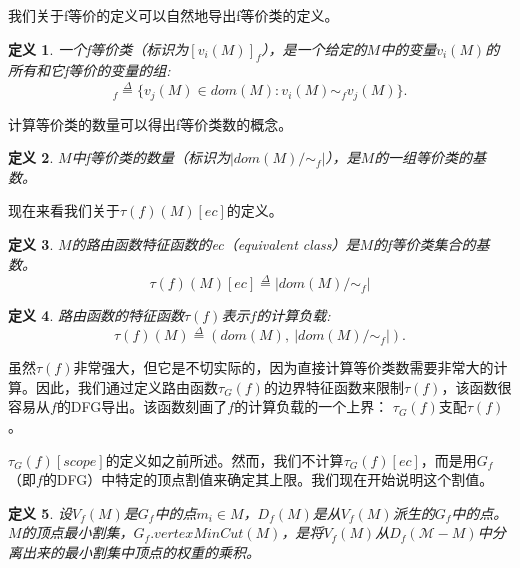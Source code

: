 \documentclass{ctexart}
\newtheorem{definition}{定义}
\begin{document}
我们关于f等价的定义可以自然地导出f等价类的定义。 
\begin{definition} 一个f等价类（标识为$[v_i(M)]_f$），是一个给定的$M$中的变量$v_i(M)$的所有和它f等价的变量的组:
\begin{equation*}
[v_i(M)]_f \overset{\Delta}{=} \{v_j(M) \in dom(M) : v_i(M) \sim_f v_j(M)\}.
\end{equation*}
\end{definition}

计算等价类的数量可以得出f等价类数的概念。
 
\begin{definition}
$M$中f等价类的数量（标识为$|dom(M)/\sim_f|$），是$M$的一组等价类的基数。
\end{definition}

现在来看我们关于$\tau(f)(M)[ec]$的定义。

\begin{definition}  $M$的路由函数特征函数的ec（equivalent class）是$M$的f等价类集合的基数。 
\begin{equation*}
\tau(f)(M)[ec] \overset{\Delta}{=} |dom(M)/\sim_f|
\end{equation*}
\end{definition}


\begin{definition} 路由函数的特征函数$\tau(f)$表示$f$的计算负载:
\begin{equation*}
\tau(f)(M) \overset{\Delta}{=} (dom(M),\ |dom(M)/\sim_f|).
\end{equation*}
\end{definition}




虽然$\tau(f)$非常强大，但它是不切实际的，因为直接计算等价类数需要非常大的计算。因此，我们通过定义路由函数$\tau_G(f)$的边界特征函数来限制$\tau(f)$，该函数很容易从$f$的DFG导出。该函数刻画了$f$的计算负载的一个上界： $\tau_G(f)$支配$\tau(f)$。

$\tau_G(f)[scope]$的定义如之前所述。然而，我们不计算$\tau_G(f)[ec]$，而是用$G_f$（即$f$的DFG）中特定的顶点割值来确定其上限。我们现在开始说明这个割值。


\begin{definition} 设$V_f(M)$是$G_f$中的点$m_i \in M$，$D_f(M)$是从$V_f(M)$派生的$G_f$中的点。
	\vspace{2mm}
	$M$的顶点最小割集，$G_f.vertexMinCut(M)$，是将$V_f(M)$从$D_f(\mathcal{M} -M)$中分离出来的最小割集中顶点的权重的乘积。
\end{definition}
\end{document}
